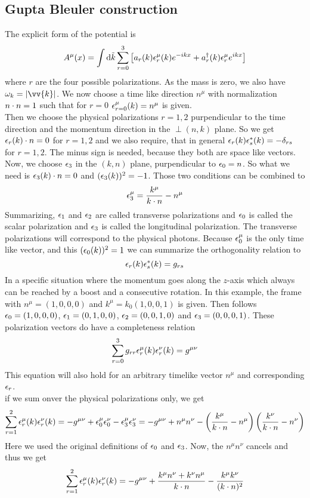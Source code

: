 \subsection{Gupta Bleuler construction}
The explicit form of the potential is
\[ A^\mu (x) = \int {\rm d} \tilde k \sum_{r = 0}^3 \left[ a_r(k) \epsilon^\mu_r(k) e^{-ikx} + a_r^\dagger(k) \epsilon_r^\mu e^{ikx}\right]\]
where $r$ are the four possible polarizations. As the mass is zero, we also have $ \omega_k = | \vv{k} |$.
We now choose a time like direction $n^\mu$ with normalization $n\cdot n = 1$ such that for $ r = 0$ $\epsilon_{r = 0}^\mu(k) = n^\mu$ is given.\\
Then we choose the physical polarizations $r = 1,2$ purpendicular to the time direction and the momentum direction in the $\perp (n,k)$ plane.
So we get $\epsilon_r(k)\cdot n = 0$ for $r = 1,2$ and we also require, that in general $\epsilon_r(k) \epsilon_s^*(k) = - \delta_{rs}$ for $r = 1,2$.
The minus sign is needed, because they both are space like vectors.\\
Now, we choose $\epsilon_3$ in the $(k,n)$ plane, purpendicular to $\epsilon_0 = n$.
So what we need is $\epsilon_3(k) \cdot n = 0$ and $(\epsilon_3(k))^2 = -1$. Those two conditions can  be combined to
\[\epsilon_3^\mu = \frac{ k^\mu}{k \cdot n} - n^\mu\]
Summarizing, $\epsilon_1$ and $\epsilon_2$ are called transverse polarizations and $\epsilon_0$ is called the scalar polarization and $\epsilon_3$ is called the longitudinal polarization. The transverse polarizations will correspond to the physical photons. Because $\epsilon_0^\mu$ is the only time like vector, and this $(\epsilon_0(k))^2 = 1$ we can summarize the orthogonality relation to
\[ \epsilon_r(k) \epsilon_s^* (k) = g_{rs}\]
In a specific situation where the momentum goes along the $z$-axis which always can be reached by a boost and a consecutive rotation. In this example, the frame with $n^\mu = (1,0,0,0)$ and $k^\mu = k_0(1, 0,0,1)$ is given. Then follows $\epsilon_0 = (1,0,0,0)$, $\epsilon_1 = (0,1,0,0)$, $\epsilon_2 = (0,0,1,0)$ and $\epsilon_3 = (0,0,0,1)$.
These polarization vectors do have a completeness relation
\[ \sum_{r = 0}^3 g_{rr} \epsilon_r^\mu(k) \epsilon_r^\nu(k) = g^{\mu\nu}\]
This equation will also hold for an arbitrary timelike vector $n^\mu$ and corresponding $\epsilon_r$.\\
if we sum onver the physical polarizations only, we get
\[ \sum_{r=1}^2 \epsilon_r^\mu(k) \epsilon_r^\nu(k) = - g^{\mu\nu} + \epsilon_0^\mu \epsilon_0 ^\nu - \epsilon_3^\mu \epsilon_3^\nu = - g^{\mu\nu} + n^\mu n^\nu - \left( \frac{k^\mu}{k\cdot n} - n^\mu\right)\left( \frac{k^\nu}{k\cdot n} - n^\nu\right)\]
Here we used the original definitions of $\epsilon_0$ and $\epsilon_3$. Now, the $n^\mu n^\nu$ cancels and thus we get
\[ \sum_{r=1}^2 \epsilon_r^\mu(k) \epsilon_r^\nu(k) = - g^{\mu\nu} + \frac{k^\mu n^\nu + k^\nu n^\mu}{k \cdot n} - \frac{k^\mu k^\nu}{(k \cdot n)^2}\]

